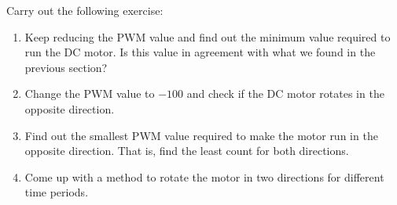 \begin{exercise} 
  Carry out the following exercise:
  \begin{enumerate}
    \item Keep reducing the PWM value and find out the minimum value
          required to run the DC motor.  Is this value in agreement with what
          we found in the previous section?
    \item Change the PWM value to $-100$ and check if the DC motor rotates
          in the opposite direction.
    \item Find out the smallest PWM value required to make the motor run
          in the opposite direction.  That is, find the least count for both
          directions.
    \item Come up with a method to rotate the motor in two directions for
          different time periods.
  \end{enumerate}
\end{exercise}

